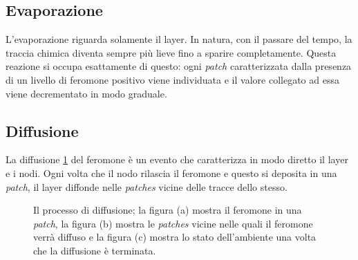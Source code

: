 \subsection{Evaporazione}
L'evaporazione riguarda solamente il layer. In natura, con il passare del tempo, la traccia chimica diventa sempre più
lieve fino a sparire completamente. Questa reazione si occupa esattamente di questo: ogni \textit{patch} caratterizzata
dalla presenza di un livello di feromone positivo viene individuata e il valore collegato ad essa viene decrementato in modo graduale.
\subsection{Diffusione}
La diffusione \cref{fig:diffusion} del feromone è un evento che caratterizza in modo diretto il layer e i nodi. Ogni volta che il nodo rilascia il feromone e
questo si deposita in una \textit{patch}, il layer diffonde nelle \textit{patches} vicine delle tracce dello stesso.
\begin{figure}[ht]
    \centering
    \caption{Il processo di diffusione; la figura (a) mostra il feromone in una \textit{patch}, la figura (b) mostra le \textit{patches} vicine nelle 
    quali il feromone verrà diffuso e la figura (c) mostra lo stato dell'ambiente una volta che la diffusione è terminata.}\label{fig:diffusion}
\end{figure}\newline
